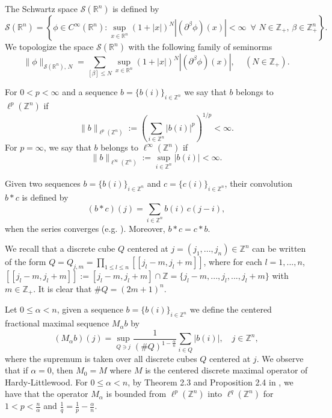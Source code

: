 \documentclass[leqno,12pt]{article} %
\theoremstyle{plain} %
\theoremstyle{definition} %
\begin{document}
The Schwartz space $\mathcal{S}(\mathbb{R}^{n})$ is defined by
\[
\mathcal{S}(\mathbb{R}^{n}) = \left\{ \phi \in C^{\infty}(\mathbb{R}^{n}) : \sup_{x \in \mathbb{R}^{n}} (1+|x|)^{N} 
|(\partial^{\beta}\phi)(x)| < \infty \,\,\, \forall \,\, N \in \mathbb{Z}_{+}, \, \beta \in \mathbb{Z}_{+}^{n}  \right\}.
\]
We topologize the space $\mathcal{S}(\mathbb{R}^{n})$ with the following family of seminorms
\[
\| \phi \|_{\mathcal{S}(\mathbb{R}^{n}), \, N} = \sum_{[\beta] \leq N} \sup_{x \in \mathbb{R}^{n}} (1+|x|)^{N} |(\partial^{\beta} \phi)(x)|, \,\,\,\,\,\,\, (N \in \mathbb{Z}_{+}).
\]

For $0 < p < \infty$ and a sequence $b = \{ b(i) \}_{i \in \mathbb{Z}^n}$ we say that $b$ belongs to $\ell^{p}(\mathbb{Z}^n)$ if
\[
\| b \|_{\ell^p(\mathbb{Z}^n)} :=\left( \sum_{i \in \mathbb{Z}^n} |b(i)|^p \right)^{1/p} < \infty.
\]
For $p=\infty$, we say that $b$ belongs to $\ell^{\infty}(\mathbb{Z}^n)$ if 
\[
\|b \|_{\ell^\infty(\mathbb{Z}^n)} := \sup_{i \in \mathbb{Z}^n} |b(i)| < \infty.
\]

Given two sequences $b=\{ b(i) \}_{i \in \mathbb{Z}^n}$ and $c=\{ c(i) \}_{i \in \mathbb{Z}^n}$, their convolution $b \ast c$ is defined by
\[
(b \ast c)(j) = \sum_{i \in \mathbb{Z}^n} b(i) \, c(j-i),
\]
when the series converges (e.g. \cite[Section 1.2.3, p. 21-25]{Loukas}). Moreover, $b \ast c = c \ast b$.

We recall that a discrete cube $Q$ centered at $j =(j_1, ..., j_n)  \in \mathbb{Z}^n$ can be written of the form 
$Q = Q_{j, m} = \prod_{1 \leq l \leq n} [[j_l -m, j_l +m]]$, where for each $l=1, ..., n$, $[[j_l -m, j_l +m]] := [j_l -m, j_l +m] \cap \mathbb{Z} = \{ j_l - m, ..., j_l, ..., j_l + m \}$ with $m \in \mathbb{Z}_{+}$. It is clear that $\# Q = (2m+1)^n$.

Let $0 \leq \alpha < n$, given a sequence $b = \{ b(i) \}_{i \in \mathbb{Z}^n}$ we define the centered fractional maximal sequence 
$M_{\alpha} b$ by
\[
(M_{\alpha} b)(j) = \sup_{Q \ni j} \frac{1}{(\# Q)^{1 - \frac{\alpha}{n}}} \sum_{i \in Q} |b(i)|, \,\,\,\,\,\, j \in \mathbb{Z}^n,
\]
where the supremum is taken over all discrete cubes $Q$ centered at $j$. We observe that if $\alpha = 0$, then $M_0 = M$ where $M$ is the centered discrete maximal operator of Hardy-Littlewood. For $0 \leq \alpha < n$, by Theorem 2.3 and Proposition 2.4 in \cite{PRocha}, we have that the operator $M_{\alpha}$ is bounded from $\ell^{p}(\mathbb{Z}^n)$ into $\ell^{q}(\mathbb{Z}^n)$ for $1 < p < \frac{n}{\alpha}$ and 
$\frac{1}{q} = \frac{1}{p} - \frac{\alpha}{n}$.
\end{document}
